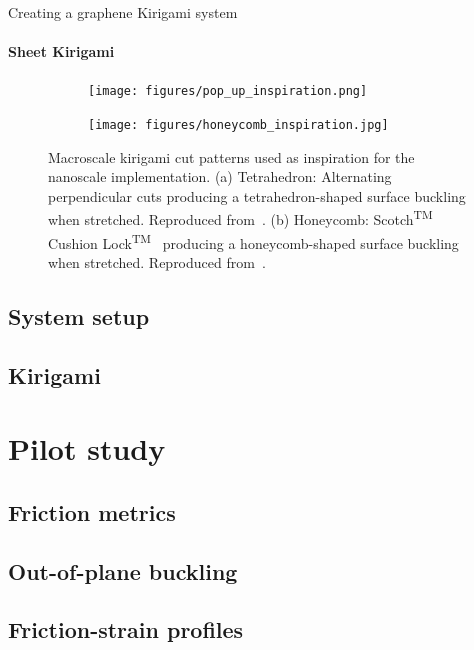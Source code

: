 \documentclass[
	10pt, %
]{beamer}
\begin{document}
\begin{frame}{Creating a graphene Kirigami system}
	\framesubtitle{Sheet Kirigami}

	\begin{figure}[H]
		\centering
		\begin{subfigure}[t]{0.48\textwidth}
			\centering
			\texttt{[image: figures/pop\_up\_inspiration.png]}
			\caption{}
		\end{subfigure}
		\hfill
		\begin{subfigure}[t]{0.48\textwidth}
			\centering
			\texttt{[image: figures/honeycomb\_inspiration.jpg]}
			\caption{}
		\end{subfigure}
		\hfill
		\caption{Macroscale kirigami cut patterns used as inspiration for the nanoscale implementation. (a) Tetrahedron: Alternating perpendicular cuts producing a tetrahedron-shaped surface buckling when stretched. Reproduced from~\cite{new_pop_up}. (b) Honeycomb: Scotch\textsuperscript{TM} Cushion Lock\textsuperscript{TM}~\cite{cushion_wrap} producing a honeycomb-shaped surface buckling when stretched. Reproduced from~\cite{cushion_wrap}.}
	  \end{figure}
\end{frame}
	






\subsection{System setup}
\subsection{Kirigami}




\section{Pilot study} %
\subsection{Friction metrics}
\subsection{Out-of-plane buckling}
\subsection{Friction-strain profiles}
\end{document}

